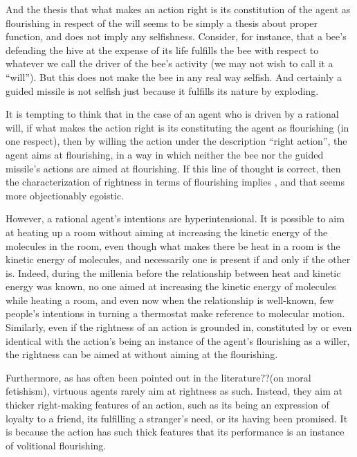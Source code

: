 And the thesis that what makes an action right is its constitution of the agent as flourishing in respect of the will
seems to be simply a thesis about proper function, and does not imply any selfishness. Consider, for instance, that a 
bee's defending the hive at the expense of its life fulfills the bee with respect to whatever we call the driver of 
the bee's activity (we may not wish to call it a ``will''). But this does not make the bee in any real way selfish. 
And certainly a guided missile is not selfish just because it fulfills its nature by exploding.

It is tempting to think that in the case of an agent who is driven by a rational will, if what makes the action 
right is its constituting the agent as flourishing (in one respect), then by willing the action under the
description ``right action'', the agent aims at flourishing, in a way in which neither the bee nor the guided missile's
actions are aimed at flourishing. If this line of thought is correct, then the characterization of rightness in terms of 
flourishing implies , and that seems more objectionably egoistic.

However, a rational agent's intentions are hyperintensional. It is possible to aim at heating up a room without aiming
at increasing the kinetic energy of the molecules in the room, even though what makes there be heat in a room is the
kinetic energy of molecules, and necessarily one is present if and only if the other is. Indeed, during the millenia 
before the relationship between heat and kinetic energy was known, no one aimed at increasing the kinetic energy of 
molecules while heating a room, and even now when the relationship is well-known, few people's intentions in turning 
a thermostat make reference to molecular motion. Similarly, even if the rightness of an action is grounded in, constituted 
by or even identical with the action's being an instance of the agent's flourishing as a willer, the rightness can be 
aimed at without aiming at the flourishing.

Furthermore, as has often been pointed out in the literature??(on moral fetishism), virtuous agents rarely aim at 
rightness as such. Instead, they aim at thicker right-making features of an action, such as its being an expression
of loyalty to a friend, its fulfilling a stranger's need, or its having been promised. It is because the action has
such thick features that its performance is an instance of volitional flourishing. 


